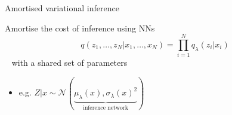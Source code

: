 \begin{frame}{Amortised variational inference}

Amortise the cost of inference using NNs
\begin{equation*}
q(z_1, \ldots, z_N|x_1, \ldots, x_N) = \prod_{i=1}^N q_\lambda(z_i|x_i)
\end{equation*}
~ with a shared set of parameters\\
\begin{itemize}
	\item e.g. $Z|x \sim \mathcal N(\underbrace{\mu_\lambda(x), \sigma_\lambda(x)^2}_{\text{inference network}})$ 
\end{itemize}

\end{frame}
